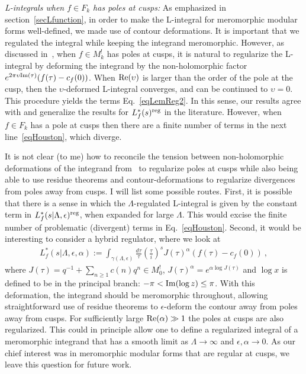 \documentclass[11pt,a4paper]{article}
\newcommand{\g}{\gamma}
\newcommand{\e}{\epsilon}
\newcommand{\La}{\Lambda}
\newcommand{\up}{\upsilon}
\newcommand{\A}{\alpha}
\newcommand{\reg}{{\rm reg}}
\begin{document}
{\em L-integrals when $f \in F_k$ has poles at cusps:} As emphasized in section~\ref{secLfunction}, in order to make the L-integral for meromorphic modular forms well-defined, we made use of contour deformations. It is important that we regulated the integral while keeping the integrand meromorphic. However, as discussed in~\cite{04-BFK, 05-BFK2}, when $f \in M_k^!$ has poles at cusps, it is natural to regularize the L-integral by deforming the integrand by the non-holomorphic factor $e^{2 \pi \up {\rm Im}(\tau)} (f(\tau) -c_f(0))$. When ${\rm Re}(\up)$ is larger than the order of the pole at the cusp, then the $\up$-deformed L-integral converges, and can be continued to $\up = 0$. This procedure yields the terms Eq.~\eqref{eqLemReg2}. In this sense, our results agree with and generalize the results for $L_f^*(s)^\reg$ in the literature. However, when $f \in F_k$ has a pole at cusps then there are a finite number of terms in the next line~\eqref{eqHouston}, which diverge. 

It is not clear (to me) how to reconcile the tension between non-holomorphic deformations of the integrand from~\cite{04-BFK, 05-BFK2} to regularize poles at cusps while also being able to use residue theorems and contour-deformations to regularize divergences from poles away from cusps. I will list some possible routes. First, it is possible that there is a sense in which the $\La$-regulated L-integral is given by the constant term in $L_f^*(s|\La,\e)^\reg$, when expanded for large $\La$. This would excise the finite number of problematic (divergent) terms in Eq.~\eqref{eqHouston}. Second, it would be interesting to consider a hybrid regulator, where we look at
\begin{align}
L_f^*(s|\La,\e,\A):= \int_{\g(\La,\e)} \frac{d\tau}{\tau} \left(\frac{\tau}{i}\right)^s J(\tau)^{\alpha} (f(\tau) -c_f(0))~,
\end{align}
where $J(\tau) = q^{-1} + \sum_{n \geq 1} c(n) q^n \in M_0^!$, $J(\tau)^\A = e^{\A \log J(\tau)}$ and $\log x$ is defined to be in the principal branch: $-\pi < {\rm Im}(\log z) \leq \pi$. With this deformation, the integrand should be meromorphic throughout, allowing straightforward use of residue theorems to $\e$-deform the contour away from poles away from cusps. For sufficiently large ${\rm Re}(\A)\gg1$ the poles at cusps are also regularized. This could in principle allow one to define a regularized integral of a meromorphic integrand that has a smooth limit as $\La \to \infty$ and $\e, \A \to 0$. As our chief interest was in meromorphic modular forms that are regular at cusps, we leave this question for future work.
\end{document}
